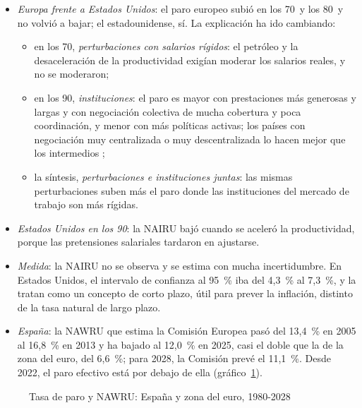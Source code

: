 \documentclass[11pt]{article}
\begin{document}
\begin{itemize}
\item \emph{Europa frente a Estados Unidos}: el paro europeo subió en los 70~y los 80~y no volvió a bajar; el estadounidense, sí\nocite{Blanchard2006European}. La explicación ha ido cambiando:
  \begin{itemize}
  \item en los 70, \emph{perturbaciones con salarios rígidos}: el petróleo y la desaceleración de la productividad exigían moderar los salarios reales, y no se moderaron\nocite{BrunoSachs1985Economics};
  \item en los 90, \emph{instituciones}: el paro es mayor con prestaciones más generosas y largas y con negociación colectiva de mucha cobertura y poca coordinación, y menor con más políticas activas\nocite{Nickell1997Unemployment}; los países con negociación muy centralizada o muy descentralizada lo hacen mejor que los intermedios\nocite{CalmforsDriffill1988} ;
  \item la síntesis, \emph{perturbaciones e instituciones juntas}: las mismas perturbaciones suben más el paro donde las instituciones del mercado de trabajo son más rígidas\nocite{BlanchardWolfers2000Role}.
  \end{itemize}
\item \emph{Estados Unidos en los 90}: la NAIRU bajó cuando se aceleró la productividad, porque las pretensiones salariales tardaron en ajustarse\nocite{BallMankiw2002NAIRU}.
\item \emph{Medida}: la NAIRU no se observa y se estima con mucha incertidumbre. En Estados Unidos, el intervalo de confianza al 95~\% iba del 4,3~\% al 7,3~\%\nocite{StaigerStockWatson1997NAIRU}, y \textcite{EstrellaMishkin1999NAIRU} la tratan como un concepto de corto plazo, útil para prever la inflación, distinto de la tasa natural de largo plazo.
\item \emph{España}: la NAWRU que estima la Comisión Europea pasó del 13,4~\% en 2005 al 16,8~\% en 2013 y ha bajado al 12,0~\% en 2025, casi el doble que la de la zona del euro, del 6,6~\%; para 2028, la Comisión prevé el 11,1~\%\nocite{CE2026AMECO}. Desde 2022, el paro efectivo está por debajo de ella (gráfico~\ref{fig:paro-nawru-espana}).
\end{itemize}

\begin{figure}[H]
\centering
\caption{Tasa de paro y NAWRU: España y zona del euro, 1980-2028}\label{fig:paro-nawru-espana}
\end{figure}
\end{document}
